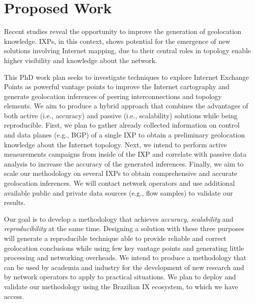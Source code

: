 \chapter{Proposed Work}\label{cap:proposal}
\thispagestyle{empty}


	Recent studies reveal the opportunity to improve the generation of geolocation knowledge. IXPs, in this context, shows potential for the emergence of new solutions involving Internet mapping, due to their central roles in topology enable higher visibility and knowledge about the network.

	This PhD work plan seeks to investigate techniques to explore Internet Exchange Points as powerful vantage points to improve the Internet cartography and generate geolocation inferences of peering interconnections and topology elements.  We aim to produce a hybrid approach that combines the advantages of both active (i.e., accuracy) and passive (i.e., scalability) solutions while being reproducible. First, we plan to gather already collected information on control and data planes (e.g., BGP) of a single IXP to obtain a preliminary geolocation knowledge about the Internet topology. Next, we intend to perform active measurements campaigns from inside of the IXP and correlate with passive data analysis to increase the accuracy of the generated inferences. Finally, we aim to scale our methodology on several IXPs to obtain comprehensive and accurate geolocation inferences. We will contact network operators and use additional available public and private data sources (e.g., flow samples) to validate our results.

	
	Our goal is to develop a methodology that achieves \emph{accuracy}, \emph{scalability} and \emph{reproducibility} at the same time. Designing a solution with these three purposes will generate a reproducible technique able to provide reliable and correct geolocation conclusions while using few key vantage points and generating little processing and networking overheads. We intend to produce a methodology that can be used by academia and industry for the development of new research and by network operators to apply to practical situations. We plan to deploy and validate our methodology using the Brazilian IX ecosystem, to which we have access.

